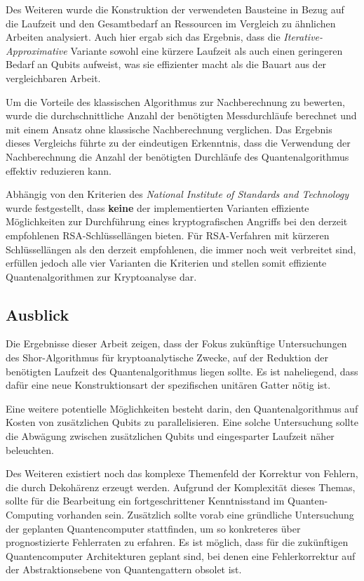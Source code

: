 Des Weiteren wurde die Konstruktion der verwendeten Bausteine in Bezug auf die Laufzeit und den Gesamtbedarf an Ressourcen im Vergleich zu ähnlichen Arbeiten analysiert. 
Auch hier ergab sich das Ergebnis, 
dass die \textit{Iterative-Approximative} Variante sowohl eine kürzere Laufzeit als auch einen geringeren Bedarf an Qubits aufweist, 
was sie effizienter macht als die Bauart aus der vergleichbaren Arbeit.

Um die Vorteile des klassischen Algorithmus zur Nachberechnung zu bewerten, 
wurde die durchschnittliche Anzahl der benötigten Messdurchläufe berechnet und 
mit einem Ansatz ohne klassische Nachberechnung verglichen. 
Das Ergebnis dieses Vergleichs führte zu der eindeutigen Erkenntnis, 
dass die Verwendung der Nachberechnung die Anzahl der benötigten Durchläufe des Quantenalgorithmus effektiv reduzieren kann. 

Abhängig von den Kriterien des \textit{National Institute of Standards and Technology} wurde festgestellt,
dass \textbf{keine} der implementierten Varianten effiziente Möglichkeiten zur Durchführung eines kryptografischen Angriffs bei den derzeit empfohlenen RSA-Schlüssellängen bieten.
Für RSA-Verfahren mit kürzeren Schlüssellängen als den derzeit empfohlenen, die immer noch weit verbreitet sind,
erfüllen jedoch alle vier Varianten die Kriterien und
stellen somit effiziente Quantenalgorithmen zur Kryptoanalyse dar.

\subsection*{Ausblick}

Die Ergebnisse dieser Arbeit zeigen, 
dass der Fokus zukünftige Untersuchungen des Shor-Algorithmus für kryptoanalytische Zwecke, 
auf der Reduktion der benötigten Laufzeit des Quantenalgorithmus liegen sollte. 
Es ist naheliegend, dass dafür eine neue Konstruktionsart der spezifischen unitären Gatter nötig ist. 

Eine weitere potentielle Möglichkeiten besteht darin, 
den Quantenalgorithmus auf Kosten von zusätzlichen Qubits zu parallelisieren. 
Eine solche Untersuchung sollte die Abwägung zwischen zusätzlichen Qubits und eingesparter Laufzeit näher beleuchten.

\vspace{1em} 

Des Weiteren existiert noch das komplexe Themenfeld der Korrektur von Fehlern, 
die durch Dekohärenz erzeugt werden. 
Aufgrund der Komplexität dieses Themas, 
sollte für die Bearbeitung ein fortgeschrittener Kenntnisstand im Quanten-Computing vorhanden sein.
Zusätzlich sollte vorab eine gründliche Untersuchung der geplanten Quantencomputer stattfinden, 
um so konkreteres über prognostizierte Fehlerraten zu erfahren. 
Es ist möglich, dass für die zukünftigen Quantencomputer Architekturen geplant sind, 
bei denen eine Fehlerkorrektur auf der Abstraktionsebene von Quantengattern obsolet ist.